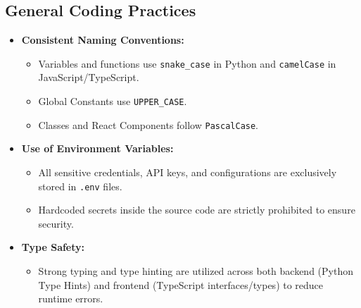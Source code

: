 \subsection{General Coding Practices}
\begin{itemize}[leftmargin=40pt]
    \item \textbf{Consistent Naming Conventions:}
    \begin{itemize}
        \item Variables and functions use \texttt{snake\_case} in Python and \texttt{camelCase} in JavaScript/TypeScript.
        \item Global Constants use \texttt{UPPER\_CASE}.
        \item Classes and React Components follow \texttt{PascalCase}.
    \end{itemize}
    \item \textbf{Use of Environment Variables:}
    \begin{itemize}
        \item All sensitive credentials, API keys, and configurations are exclusively stored in \texttt{.env} files.
        \item Hardcoded secrets inside the source code are strictly prohibited to ensure security.
    \end{itemize}
    \item \textbf{Type Safety:}
    \begin{itemize}
        \item Strong typing and type hinting are utilized across both backend (Python Type Hints) and frontend (TypeScript interfaces/types) to reduce runtime errors.
    \end{itemize}
\end{itemize}

